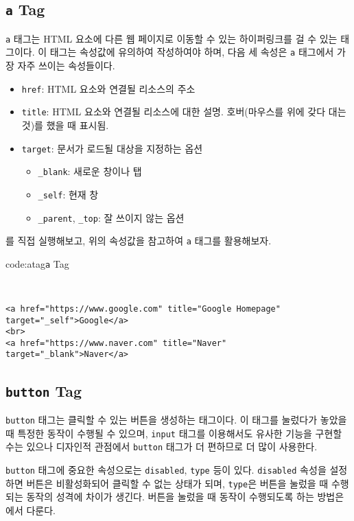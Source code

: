 \subsection*{\texttt{a} Tag}
\texttt{a} 태그는 HTML 요소에 다른 웹 페이지로 이동할 수 있는 하이퍼링크를 걸 수 있는 태그이다. 이 태그는 속성값에 유의하여 작성하여야 하며, 다음 세 속성은 \texttt{a} 태그에서 가장 자주 쓰이는 속성들이다. 

\begin{itemize}
    \item \texttt{href}: HTML 요소와 연결될 리소스의 주소
    \item \texttt{title}: HTML 요소와 연결될 리소스에 대한 설명. 호버(마우스를 위에 갖다 대는 것)를 했을 때 표시됨.
    \item \texttt{target}: 문서가 로드될 대상을 지정하는 옵션
        \begin{itemize}
            \item \texttt{\_blank}: 새로운 창이나 탭
            \item \texttt{\_self}: 현재 창
            \item \texttt{\_parent}, \texttt{\_top}: 잘 쓰이지 않는 옵션
        \end{itemize}
\end{itemize}

를 직접 실행해보고, 위의 속성값을 참고하여 \texttt{a} 태그를 활용해보자.

\begin{codeenv}{code:atag}{\texttt{a} Tag}\begin{verbatim}


<a href="https://www.google.com" title="Google Homepage" target="_self">Google</a>
<br>
<a href="https://www.naver.com" title="Naver" target="_blank">Naver</a>
\end{verbatim}
\end{codeenv}

\subsection*{\texttt{button} Tag}
\texttt{button} 태그는 클릭할 수 있는 버튼을 생성하는 태그이다. 이 태그를 눌렀다가 놓았을 때 특정한 동작이 수행될 수 있으며, \texttt{input} 태그를 이용해서도 유사한 기능을 구현할 수는 있으나 디자인적 관점에서 \texttt{button} 태그가 더 편하므로 더 많이 사용한다. 

\texttt{button} 태그에 중요한 속성으로는 \texttt{disabled}, \texttt{type} 등이 있다. \texttt{disabled} 속성을 설정하면 버튼은 비활성화되어 클릭할 수 없는 상태가 되며, \texttt{type}은 버튼을 눌렀을 때 수행되는 동작의 성격에 차이가 생긴다. 버튼을 눌렀을 때 동작이 수행되도록 하는 방법은 에서 다룬다.

